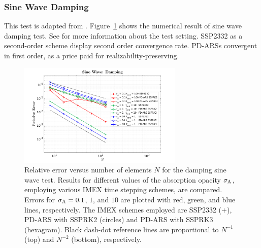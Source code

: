 \subsubsection{Sine Wave Damping}
This test is adapted from \cite{skinnerOstriker_2013}.
Figure~\ref{fig:SineWaveDamping} shows the numerical result of sine wave damping test.
See \cite{chu_2018} for more information about the test setting.
SSP2332 as a second-order scheme display second order convergence rate.
PD-ARSs convergent in first order, as a price paid for realizability-preserving.
\begin{figure}[h]
  \centering
    \includegraphics[width=0.7\textwidth]{figures/SineWaveDamping}
   \caption{Relative error versus number of elements $N$ for the damping sine wave test. Results for different values of the absorption opacity $\sigma_{{\rm A}}$, employing various IMEX time stepping schemes, are compared.  Errors for $\sigma_{{\rm A}}=0.1$, $1$, and $10$ are plotted with red, green, and blue lines, respectively.  The IMEX schemes employed are SSP2332 ($+$), PD-ARS with SSPRK2 (circles) and PD-ARS with SSPRK3 (hexagram).  Black dash-dot reference lines are proportional to $N^{-1}$ (top) and $N^{-2}$ (bottom), respectively.}
  \label{fig:SineWaveDamping}
\end{figure}

